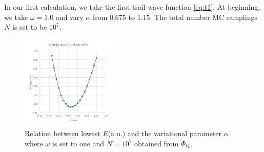 In our first calculation, we take the first trail wave function \ref{eq:t1}.
At beginning, we take $\omega=1.0$ and vary $\alpha$ from 0.675 to 1.15.
The total number MC samplings $N$ is set to be $10^7$.
\begin{figure}[tb]
\label{fig:t1}
\centering
\includegraphics[width=0.4\textwidth]{t1.png}
\caption{Relation between lowest $E$(a.u.) and the variational parameter $\alpha$ where $\omega$ is set to one and $N=10^7$ obtained from $\Phi_{t1}$.}
\end{figure}


